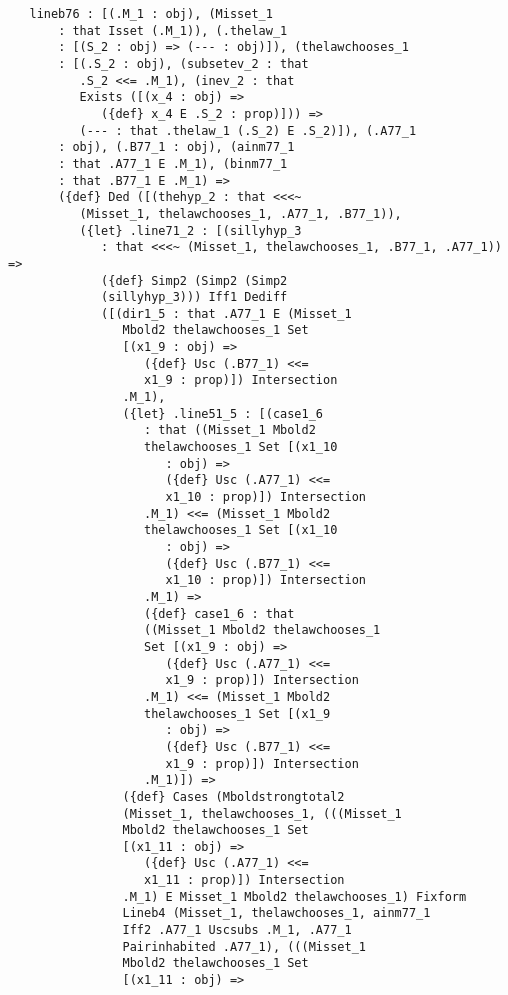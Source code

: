 \documentclass[12pt]{article}
\begin{document}
\begin{verbatim}
   lineb76 : [(.M_1 : obj), (Misset_1 
       : that Isset (.M_1)), (.thelaw_1 
       : [(S_2 : obj) => (--- : obj)]), (thelawchooses_1 
       : [(.S_2 : obj), (subsetev_2 : that 
          .S_2 <<= .M_1), (inev_2 : that 
          Exists ([(x_4 : obj) => 
             ({def} x_4 E .S_2 : prop)])) => 
          (--- : that .thelaw_1 (.S_2) E .S_2)]), (.A77_1 
       : obj), (.B77_1 : obj), (ainm77_1 
       : that .A77_1 E .M_1), (binm77_1 
       : that .B77_1 E .M_1) => 
       ({def} Ded ([(thehyp_2 : that <<<~ 
          (Misset_1, thelawchooses_1, .A77_1, .B77_1)), 
          ({let} .line71_2 : [(sillyhyp_3 
             : that <<<~ (Misset_1, thelawchooses_1, .B77_1, .A77_1)) => 
             ({def} Simp2 (Simp2 (Simp2 
             (sillyhyp_3))) Iff1 Dediff 
             ([(dir1_5 : that .A77_1 E (Misset_1 
                Mbold2 thelawchooses_1 Set 
                [(x1_9 : obj) => 
                   ({def} Usc (.B77_1) <<= 
                   x1_9 : prop)]) Intersection 
                .M_1), 
                ({let} .line51_5 : [(case1_6 
                   : that ((Misset_1 Mbold2 
                   thelawchooses_1 Set [(x1_10 
                      : obj) => 
                      ({def} Usc (.A77_1) <<= 
                      x1_10 : prop)]) Intersection 
                   .M_1) <<= (Misset_1 Mbold2 
                   thelawchooses_1 Set [(x1_10 
                      : obj) => 
                      ({def} Usc (.B77_1) <<= 
                      x1_10 : prop)]) Intersection 
                   .M_1) => 
                   ({def} case1_6 : that 
                   ((Misset_1 Mbold2 thelawchooses_1 
                   Set [(x1_9 : obj) => 
                      ({def} Usc (.A77_1) <<= 
                      x1_9 : prop)]) Intersection 
                   .M_1) <<= (Misset_1 Mbold2 
                   thelawchooses_1 Set [(x1_9 
                      : obj) => 
                      ({def} Usc (.B77_1) <<= 
                      x1_9 : prop)]) Intersection 
                   .M_1)]) => 
                ({def} Cases (Mboldstrongtotal2 
                (Misset_1, thelawchooses_1, (((Misset_1 
                Mbold2 thelawchooses_1 Set 
                [(x1_11 : obj) => 
                   ({def} Usc (.A77_1) <<= 
                   x1_11 : prop)]) Intersection 
                .M_1) E Misset_1 Mbold2 thelawchooses_1) Fixform 
                Lineb4 (Misset_1, thelawchooses_1, ainm77_1 
                Iff2 .A77_1 Uscsubs .M_1, .A77_1 
                Pairinhabited .A77_1), (((Misset_1 
                Mbold2 thelawchooses_1 Set 
                [(x1_11 : obj) => 

\end{verbatim}
\end{document}
